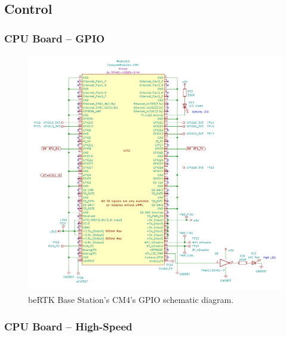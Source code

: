 \subsection{Control}\label{sec:322_CONTROL}

\subsubsection{CPU Board -- GPIO}\label{sec:3221_CM4_GPIO}

\begin{figure}[h]
	\centering
	\includegraphics[width=1.0\textwidth]{Chapters/Figures/chapter3/CM4_GPIO.pdf}
	\caption{beRTK\textsuperscript{\textregistered} Base Station's CM4's GPIO schematic diagram.}
	\label{fig:CM4_GPIO_circuit}
\end{figure}

\subsubsection{CPU Board -- High-Speed}\label{sec:3222_CM4_HSpeed}

